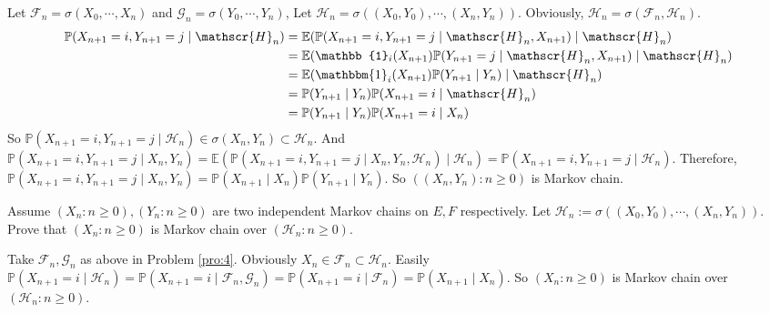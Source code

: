 \documentclass{ctexart}
\begin{document}
\begin{solution}
  Let \(\mathcal{F}_n=\sigma(X_0,\cdots,X_n)\) and \(\mathcal{G}_n=\sigma(Y_0,\cdots,Y_n)\),
  Let \(\mathcal{H}_n=\sigma((X_0,Y_0),\cdots,(X_n,Y_n))\).
  Obviously, \(\mathscr{H}_n=\sigma(\mathscr{F}_n,\mathscr{H}_n)\).
  \[
    \begin{aligned}
      \mathbb{P}(X_{n + 1}=i,Y_{n + 1}=j \mid \mathscr{H}_n) & = \mathbb{E}(\mathbb{P}(X_{n + 1}=i,Y_{n + 1}=j \mid \mathscr{H}_n,X_{n + 1})\mid \mathscr{H}_n)            \\
                                                             & = \mathbb{E}(\mathbb{1}_i(X_{n + 1})\mathbb{P}(Y_{n + 1}=j \mid \mathscr{H}_n,X_{n + 1})\mid \mathscr{H}_n) \\
                                                             & = \mathbb{E}(\mathbbm{1}_i(X_{n + 1})\mathbb{P}(Y_{n + 1}\mid Y_n)\mid \mathscr{H}_n)                       \\
                                                             & =\mathbb{P}(Y_{n + 1} \mid Y_n)\mathbb{P}(X_{n + 1}=i \mid \mathscr{H}_n)                                   \\
                                                             & =\mathbb{P}(Y_{n + 1} \mid Y_n)\mathbb{P}(X_{n + 1}=i \mid X_n)
    \end{aligned}
  \]
  So \(\mathbb{P}(X_{n + 1}=i, Y_{n + 1}=j \mid \mathscr{H}_n) \in \sigma(X_n,Y_n)\subset \mathscr{H}_n\).
  And \(\mathbb{P}(X_{n + 1} =i,Y_{n + 1}=j \mid X_n,Y_n)=\mathbb{E}(\mathbb{P}(X_{n + 1}=i, Y_{n + 1}=j \mid X_n, Y_n, \mathscr{H}_n) \mid \mathscr{H}_n)=\mathbb{P}(X_{n + 1}=i,Y_{n + 1}=j \mid \mathscr{H}_n)\).
  Therefore, \(\mathbb{P}(X_{n + 1}=i,Y_{n + 1}=j \mid X_n, Y_n)=\mathbb{P}(X_{n + 1} \mid X_n)\mathbb{P}(Y_{n + 1} \mid Y_n)\).
  So \(((X_n,Y_n):n \geq 0)\) is Markov chain.
\end{solution}
\begin{problem}\label{pro:5}
  Assume \((X_n:n \geq 0),(Y_n:n \geq 0)\) are two independent Markov chains on \(E,F\) respectively.
  Let \(\mathcal{H}_n:=\sigma((X_0,Y_0),\cdots,(X_n,Y_n))\).
  Prove that \((X_n:n \geq 0)\) is Markov chain over \((\mathcal{H}_n:n \geq 0)\).
\end{problem}
\begin{solution}
  Take \(\mathcal{F}_n,\mathcal{G}_n\) as above in Problem \ref{pro:4}.
  Obviously \(X_n \in \mathcal{F}_n \subset \mathcal{H}_n\).
  Easily \(\mathbb{P}(X_{n+1}=i \mid \mathcal{H}_n)=\mathbb{P}(X_{n+1} =i \mid \mathcal{F}_n,\mathcal{G}_n)=\mathbb{P}(X_{n+1} =i \mid \mathcal{F}_n)=\mathbb{P}(X_{n+1} \mid X_n)\).
  So \((X_n:n \geq 0)\) is Markov chain over \((\mathcal{H}_n:n \geq 0)\).
\end{solution}
\end{document}
